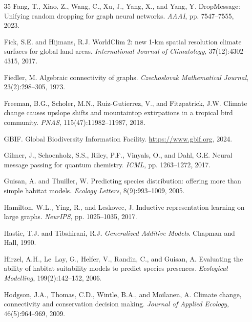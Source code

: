 \begin{thebibliography}{35}
Fang, T., Xiao, Z., Wang, C., Xu, J., Yang, X., and Yang, Y.
\newblock DropMessage: Unifying random dropping for graph neural networks.
\newblock \emph{AAAI}, pp. 7547--7555, 2023.

Fick, S.E. and Hijmans, R.J.
\newblock WorldClim 2: new 1-km spatial resolution climate surfaces for global
  land areas.
\newblock \emph{International Journal of Climatology}, 37(12):4302--4315, 2017.

Fiedler, M.
\newblock Algebraic connectivity of graphs.
\newblock \emph{Czechoslovak Mathematical Journal}, 23(2):298--305, 1973.

Freeman, B.G., Scholer, M.N., Ruiz-Gutierrez, V., and Fitzpatrick, J.W.
\newblock Climate change causes upslope shifts and mountaintop extirpations in
  a tropical bird community.
\newblock \emph{PNAS}, 115(47):11982--11987, 2018.

GBIF.
\newblock Global Biodiversity Information Facility.
\newblock \url{https://www.gbif.org}, 2024.

Gilmer, J., Schoenholz, S.S., Riley, P.F., Vinyals, O., and Dahl, G.E.
\newblock Neural message passing for quantum chemistry.
\newblock \emph{ICML}, pp. 1263--1272, 2017.

Guisan, A. and Thuiller, W.
\newblock Predicting species distribution: offering more than simple habitat
  models.
\newblock \emph{Ecology Letters}, 8(9):993--1009, 2005.

Hamilton, W.L., Ying, R., and Leskovec, J.
\newblock Inductive representation learning on large graphs.
\newblock \emph{NeurIPS}, pp. 1025--1035, 2017.

Hastie, T.J. and Tibshirani, R.J.
\newblock \emph{Generalized Additive Models}.
\newblock Chapman and Hall, 1990.

Hirzel, A.H., Le~Lay, G., Helfer, V., Randin, C., and Guisan, A.
\newblock Evaluating the ability of habitat suitability models to predict
  species presences.
\newblock \emph{Ecological Modelling}, 199(2):142--152, 2006.

Hodgson, J.A., Thomas, C.D., Wintle, B.A., and Moilanen, A.
\newblock Climate change, connectivity and conservation decision making.
\newblock \emph{Journal of Applied Ecology}, 46(5):964--969, 2009.


\end{thebibliography}
